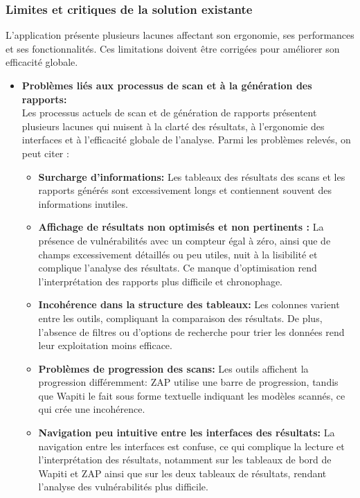     \subsubsection{Limites et critiques de la solution existante}
    L’application présente plusieurs lacunes affectant son ergonomie, ses performances et ses fonctionnalités. Ces limitations doivent être corrigées pour améliorer son efficacité globale.
        \begin{itemize}[label=\textcolor{red}{}]
            \item \textbf{Problèmes liés aux processus de scan et à la génération des rapports:}\\
            Les processus actuels de scan et de génération de rapports présentent plusieurs lacunes qui nuisent à la clarté des résultats, à l’ergonomie des interfaces et à l’efficacité globale de l’analyse. Parmi les problèmes relevés, on peut citer :
                \begin{itemize}[label=$\bullet$, left=-0.05cm]
                    \item \textbf{Surcharge d’informations:} Les tableaux des résultats des scans et les rapports générés sont excessivement longs et contiennent souvent des informations inutiles.
                   \item \textbf{Affichage de résultats non optimisés et non pertinents :} La présence de vulnérabilités avec un compteur égal à zéro, ainsi que de champs excessivement détaillés ou peu utiles, nuit à la lisibilité et complique l’analyse des résultats. Ce manque d’optimisation rend l’interprétation des rapports plus difficile et chronophage.
                    \item \textbf{Incohérence dans la structure des tableaux:} Les colonnes varient entre les outils, compliquant la comparaison des résultats. De plus, l'absence de filtres ou d'options de recherche pour trier les données rend leur exploitation moins efficace.
                    \item \textbf{Problèmes de progression des scans:} Les outils affichent la progression différemment: ZAP utilise une barre de progression, tandis que Wapiti le fait sous forme textuelle indiquant les modèles scannés, ce qui crée une incohérence.
                    \item \textbf{Navigation peu intuitive entre les interfaces des résultats:} La navigation entre les interfaces est confuse, ce qui complique la lecture et l’interprétation des résultats, notamment sur les tableaux de bord de Wapiti et ZAP ainsi que sur les deux tableaux de résultats, rendant l’analyse des vulnérabilités plus difficile.

\end{itemize}
\end{itemize}
